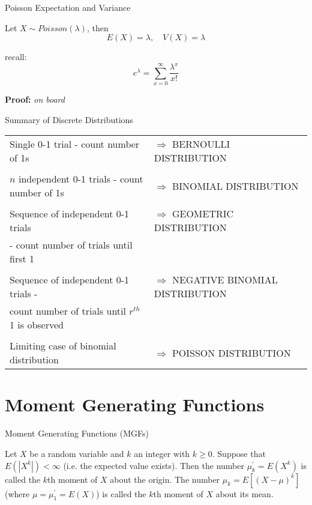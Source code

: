 \documentclass[12pt,ignorenonframetext,compress]{beamer}
\begin{document}
\begin{frame}{Poisson Expectation and Variance}

Let \(X \sim Poisson(\lambda)\), then
\[E(X) = \lambda, \quad V(X) = \lambda\]

recall: \[e^\lambda = \sum_{x=0}^{\infty} \frac{\lambda^x}{x!} \]

\textbf{Proof:} \emph{on board}

\end{frame}

\begin{frame}{Summary of Discrete Distributions}

\footnotesize{
\begin{tabular}{ll}
Single 0-1 trial - count number of 1s & $\Longrightarrow $ BERNOULLI
DISTRIBUTION \\
&  \\
$n$ independent 0-1 trials - count number of 1s & $\Longrightarrow $
BINOMIAL DISTRIBUTION \\
&  \\
Sequence of independent 0-1 trials & $\Longrightarrow $ GEOMETRIC
DISTRIBUTION \\
- count number of trials until first 1 &  \\
&  \\
Sequence of independent 0-1 trials - & $\Longrightarrow $ NEGATIVE BINOMIAL
DISTRIBUTION \\
count number of trials until $r^{th}$ 1 is observed &  \\
&  \\
Limiting case of binomial distribution & $\Longrightarrow $ POISSON
DISTRIBUTION
\end{tabular}
}

\end{frame}

\section{Moment Generating Functions}\label{moment-generating-functions}

\begin{frame}{Moment Generating Functions (MGFs)}

\begin{definition}[Moments]
Let $X$ be a random variable and $k$ an integer with $k \geq 0$. Suppose that $E(|X^k|) < \infty$ (i.e. the expected value exists). Then the number $\mu_k^\prime = E(X^k)$ is called the $k$th moment of $X$ about the origin. The number $\mu_k = E[(X-\mu)^k ]$ (where $\mu = \mu_1^\prime = E(X)$) is called the $k$th moment of $X$ about its mean.
\end{definition}

\end{frame}
\end{document}
